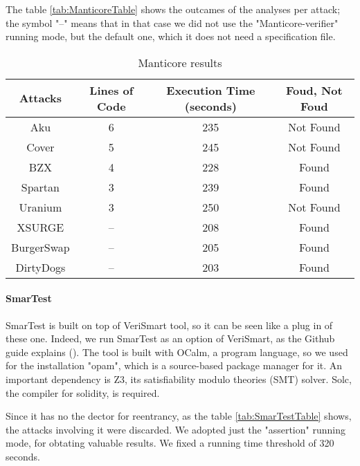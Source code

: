 The table \autoref*{tab:ManticoreTable} shows the outcames of the analyses per attack; the symbol "--" means that in that case we did not use the 
"Manticore-verifier" running mode, but the default one, which it does not need a specification file.

\begin{center}
\begin{table*}
    \caption{Manticore results}
        \label{tab:ManticoreTable}
        \begin{tabular}{cccc}
        \toprule
            Attacks & Lines of Code & Execution Time (seconds) & Foud, Not Foud\\
            \midrule
            Aku & 6 & 235  & Not Found \\ 
            Cover & 5 & 245 & Not Found \\ 
            BZX  & 4 & 228 & Found \\ 
            Spartan & 3 & 239 & Found \\ 
            Uranium  & 3 & 250 & Not Found \\ 
            XSURGE & -- & 208 & Found \\ 
            BurgerSwap  &  -- & 205 & Found\\ 
            DirtyDogs & -- & 203 & Found \\
        \bottomrule
    \end{tabular}
\end{table*}
\end{center}

\paragraph{SmarTest} SmarTest is built on top of VeriSmart tool, so it can be seen like a plug in of these one. Indeed, we run SmarTest as an option of VeriSmart, 
as the Github guide explains (\cite{SmarTestGitHub}). The tool is built with OCalm, a program language, so we used for the installation "opam", which is a source-based package manager for it.
An important dependency is Z3, its satisfiability modulo theories (SMT) solver. Solc, the compiler for solidity, is required.

Since it has no the dector for reentrancy, as the table \autoref{tab:SmarTestTable} shows, the attacks involving it were discarded. 
We adopted just the "assertion" running mode, for obtating valuable results. 
We fixed a running time threshold of 320 seconds.

